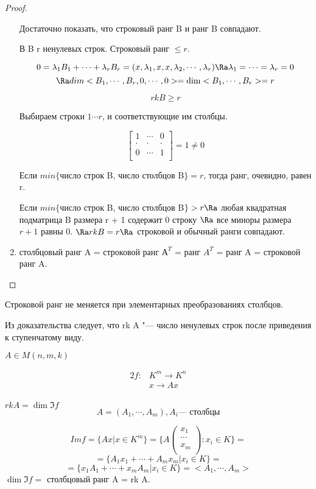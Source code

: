 \begin{proof}
\begin{enumerate}
Достаточно показать, что строковый ранг B и ранг B совпадают.

В B r ненулевых строк. Строковый ранг $\le r$.

$$0 = \lambda_1 B_1 + \cdots + \lambda_rB_r = (x, \lambda_1, x, x, \lambda_2, \cdots, \lambda_r) \Ra \lambda_1 = \cdots = \lambda_r = 0$$
$$\Ra dim<B_1, \cdots, B_r, 0, \cdots, 0> = \dim <B_1, \cdots, B_r> = r$$

$$rk B \ge r$$

Выбираем строки $1 \cdots r$, и соответствующие им столбцы. 

$$
\begin{bmatrix}
1&\cdots&0\\
\cdot&\cdot&\cdot\\
0&\cdots&1\\
\end{bmatrix} = 1 \ne 0
$$

Если $min\{$число строк B, число столбцов B$\} = r$, тогда ранг, очевидно, равен r.

Если $min\{$число строк B, число столбцов B$\} > r \Ra$ любая квадратная 
подматрица B размера r + 1 содержит 0 строку $\Ra$ все миноры размера $r + 1$ равны 0.
$\Ra rk B = r \Ra$ строковой и обычный ранги совпадают. 

\item столбцовый ранг A = строковой ранг $А^T$ = ранг $A^T$ = ранг A = строковой ранг A.
\end{enumerate}
\end{proof}

\begin{conseq}
Строковой ранг не меняется при элементарных преобразованиях столбцов. 
\end{conseq}

\begin{Rem}
Из доказательства следует, что rk A "--- число ненулевых  строк после приведения
к ступенчатому виду. 
\end{Rem}

\begin{Rem}
$A \in M(n, m, k)$

\begin{alignat*}{2}
f\colon& K^m \to K^n\\
       & x \to Ax\\
\end{alignat*}


$rk A = \dim \Im f$
$$A = (A_1, \cdots, A_m), A_i \text{--- столбцы}$$

$$Im f = \{Ax| x \in K^{m} \} = \{A \begin{pmatrix}x_1\\ \cdots\\ x_m\\ \end{pmatrix} \colon x_i \in K \} = $$
$$= \{A_1 x_1 + \cdots + A_m x_m| x_i \in K\} = $$
$$= \{x_1 A_1 + \cdots + x_m A_m| x_i \in K\} = <A_1, \cdots, A_m> $$
$\dim \Im f = $ столбцовый ранг A = rk A.
\end{Rem}

